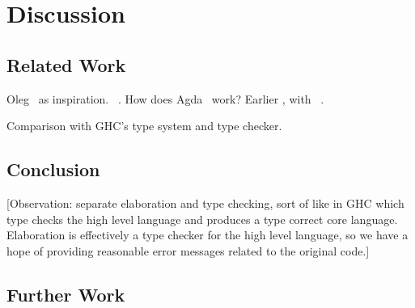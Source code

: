 \section{Discussion}

\subsection{Related Work}

Oleg~\cite{McBride1999} as inspiration. \Epigram{}~\cite{McBride2004a}.
How does Agda~\cite{norell2007thesis} work?
Earlier \Idris{}, with \Ivor{}~\cite{Brady2006b}.

Comparison with GHC's type system and type checker.

\subsection{Conclusion}

[Observation: separate elaboration and type checking, sort of like in GHC which
type checks the high level language and produces a type correct core language.
Elaboration is effectively a type checker for the high level language, so we have
a hope of providing reasonable error messages related to the original code.]

\subsection{Further Work}
